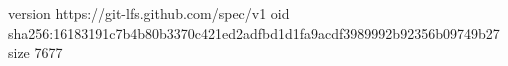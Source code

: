 version https://git-lfs.github.com/spec/v1
oid sha256:16183191c7b4b80b3370c421ed2adfbd1d1fa9acdf3989992b92356b09749b27
size 7677
